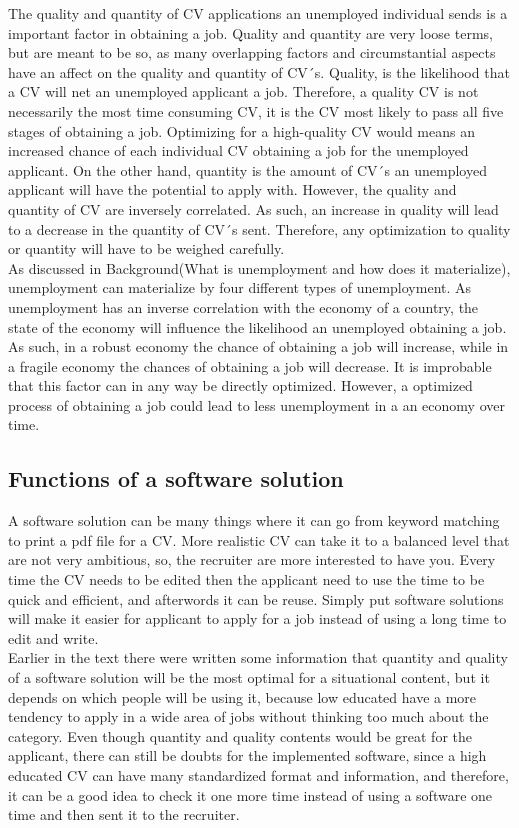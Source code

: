 The quality and quantity of CV applications an unemployed individual sends is a important factor in obtaining a job.
Quality and quantity are very loose terms, but are meant to be so, as many overlapping factors and circumstantial aspects have an affect on the quality and quantity of CV´s.
Quality, is the likelihood that a CV will net an unemployed applicant a job.
Therefore, a quality CV is not necessarily the most time consuming CV, it is the CV most likely to pass all five stages of obtaining a job.
Optimizing for a high-quality CV would means an increased chance of each individual CV obtaining a job for the unemployed applicant.
On the other hand, quantity is the amount of CV´s an unemployed applicant will have the potential to apply with.
However, the quality and quantity of CV are inversely correlated.
As such, an increase in quality will lead to a decrease in the quantity of CV´s sent.
Therefore, any optimization to quality or quantity will have to be weighed carefully. \\

As discussed in Background(What is unemployment and how does it materialize), unemployment can materialize by four different types of unemployment.
As unemployment has an inverse correlation with the economy of a country, the state of the economy will influence the likelihood an unemployed obtaining a job.
As such, in a robust economy the chance of obtaining a job will increase, while in a fragile economy the chances of obtaining a job will decrease.
It is improbable that this factor can in any way be directly optimized.
However, a optimized process of obtaining a job could lead to less unemployment in a an economy over time.

\subsection{Functions of a software solution}
A software solution can be many things where it can go from keyword matching to print a pdf file for a CV.
More realistic CV can take it to a balanced level that are not very ambitious, 
so, the recruiter are more interested to have you. Every time the CV needs to be edited
then the applicant need to use the time to be quick and efficient, and afterwords it can be reuse.
Simply put software solutions will make it easier for applicant to apply for a job instead of using a long time to edit and write. \\

Earlier in the text there were written some information 
that quantity and quality of a software solution will be the most optimal for a situational content,
but it depends on which people will be using it, because low educated have a more tendency to apply
in a wide area of jobs without thinking too much about the category. 
Even though quantity and quality contents would be great for the applicant, 
there can still be doubts for the implemented software, since a high educated CV can have many standardized format and information,
and therefore, it can be a good idea to check it one more time instead of using a software one time and then sent it to the recruiter. \\


